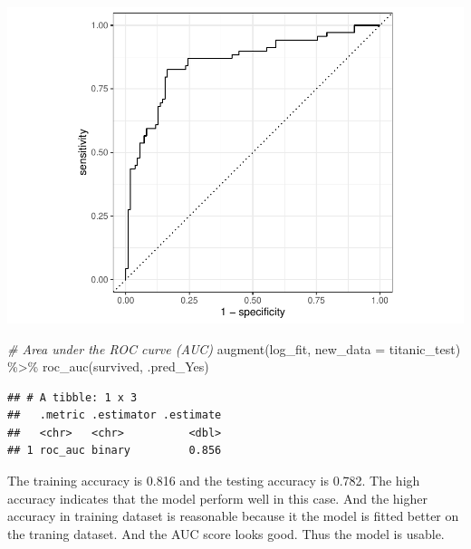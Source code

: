 \documentclass[
]{article}
\newenvironment{Shaded}{\begin{snugshade}}{\end{snugshade}}
\newcommand{\AttributeTok}[1]{\textcolor[rgb]{0.77,0.63,0.00}{#1}}
\newcommand{\CommentTok}[1]{\textcolor[rgb]{0.56,0.35,0.01}{\textit{#1}}}
\newcommand{\FunctionTok}[1]{\textcolor[rgb]{0.00,0.00,0.00}{#1}}
\newcommand{\NormalTok}[1]{#1}
\newcommand{\SpecialCharTok}[1]{\textcolor[rgb]{0.00,0.00,0.00}{#1}}
\begin{document}
\includegraphics{hw3_files/figure-latex/unnamed-chunk-19-2.pdf}

\begin{Shaded}
\begin{Highlighting}[]
\CommentTok{\# Area under the ROC curve (AUC)}
\FunctionTok{augment}\NormalTok{(log\_fit, }\AttributeTok{new\_data =}\NormalTok{ titanic\_test) }\SpecialCharTok{\%\textgreater{}\%}
  \FunctionTok{roc\_auc}\NormalTok{(survived, .pred\_Yes)}
\end{Highlighting}
\end{Shaded}

\begin{verbatim}
## # A tibble: 1 x 3
##   .metric .estimator .estimate
##   <chr>   <chr>          <dbl>
## 1 roc_auc binary         0.856
\end{verbatim}

The training accuracy is 0.816 and the testing accuracy is 0.782. The
high accuracy indicates that the model perform well in this case. And
the higher accuracy in training dataset is reasonable because it the
model is fitted better on the traning dataset. And the AUC score looks
good. Thus the model is usable.
\end{document}
